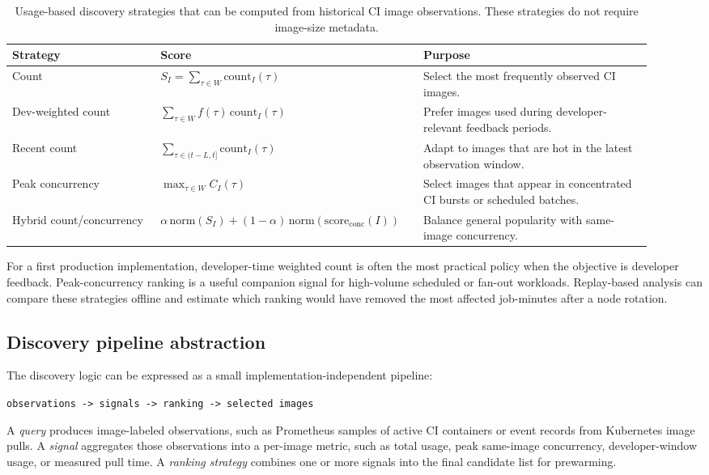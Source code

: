 \documentclass[11pt,a4paper]{article}
\begin{document}
\begin{table}[H]
\centering
\caption{Usage-based discovery strategies that can be computed from historical CI image observations. These strategies do not require image-size metadata.}
\label{tab:discovery-strategies}
\scriptsize
\begin{adjustbox}{max width=\linewidth}
\begin{tabular}{p{0.22\linewidth}p{0.36\linewidth}p{0.34\linewidth}}
\toprule
Strategy & Score & Purpose \\
\midrule
Count & \(S_I=\sum_{\tau\in W}\mathrm{count}_I(\tau)\) & Select the most frequently observed CI images. \\
Dev-weighted count & \(\sum_{\tau\in W} f(\tau)\,\mathrm{count}_I(\tau)\) & Prefer images used during developer-relevant feedback periods. \\
Recent count & \(\sum_{\tau\in(t-L,t]}\mathrm{count}_I(\tau)\) & Adapt to images that are hot in the latest observation window. \\
Peak concurrency & \(\max_{\tau\in W} C_I(\tau)\) & Select images that appear in concentrated CI bursts or scheduled batches. \\
Hybrid count/concurrency & \(\alpha\,\mathrm{norm}(S_I)+(1-\alpha)\,\mathrm{norm}(\mathrm{score}_{\mathrm{conc}}(I))\) & Balance general popularity with same-image concurrency. \\
\bottomrule
\end{tabular}
\end{adjustbox}
\end{table}


For a first production implementation, developer-time weighted count is often the most practical policy when the objective is developer feedback. Peak-concurrency ranking is a useful companion signal for high-volume scheduled or fan-out workloads. Replay-based analysis can compare these strategies offline and estimate which ranking would have removed the most affected job-minutes after a node rotation.

\subsection{Discovery pipeline abstraction}

The discovery logic can be expressed as a small implementation-independent pipeline:
\begin{center}
\texttt{observations -> signals -> ranking -> selected images}
\end{center}
A \emph{query} produces image-labeled observations, such as Prometheus samples of active CI containers or event records from Kubernetes image pulls. A \emph{signal} aggregates those observations into a per-image metric, such as total usage, peak same-image concurrency, developer-window usage, or measured pull time. A \emph{ranking strategy} combines one or more signals into the final candidate list for prewarming.
\end{document}
